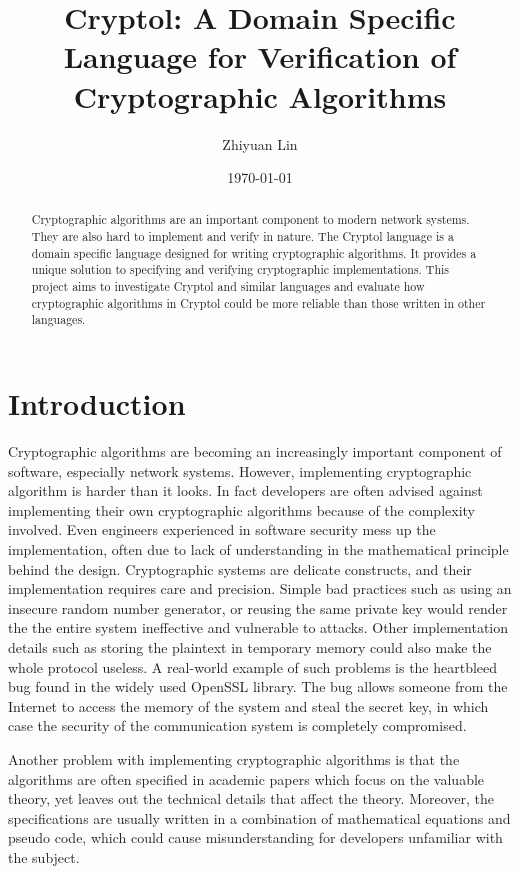 \documentclass[a4paper, notitlepage]{report}
\title{Cryptol: A Domain Specific Language for  Verification of Cryptographic Algorithms}
\author{Zhiyuan Lin}
\date{\today}
\begin{document}
\maketitle
\begin{abstract}
Cryptographic algorithms are an important component to modern network systems. They are also hard to implement 
and verify in nature. The Cryptol language is a domain specific language designed for writing cryptographic algorithms.
It provides a unique solution to specifying and verifying cryptographic implementations. This project aims to investigate Cryptol and similar languages and evaluate how cryptographic algorithms in Cryptol could be more reliable than those written 
in other languages. 
\end{abstract}

\newpage
\vspace{30pt}



\chapter{Introduction}


Cryptographic algorithms are becoming an increasingly important component
of software, especially network systems. However, implementing cryptographic algorithm is harder than it looks.
In fact developers are often advised against
implementing their own cryptographic algorithms
because of the complexity involved.
Even engineers experienced in software security mess up the implementation,
often due to lack of understanding in the mathematical principle
behind the design.
Cryptographic systems are delicate constructs,
and their implementation requires care and precision.
Simple bad practices such as using an insecure random number generator,
or reusing the same private key would render the the entire system ineffective
and vulnerable to attacks.
Other implementation details such as storing the plaintext in temporary memory
could also make the whole protocol useless.
A real-world example of such problems is the heartbleed bug
found in the widely used OpenSSL library.
The bug allows someone from the Internet to access the memory of the system
and steal the secret key, in which case the security of the communication
system is completely compromised.

Another problem with implementing cryptographic algorithms is that the algorithms are often specified in academic papers which focus on the valuable theory, yet leaves out the technical details that affect the theory. Moreover, the specifications are usually written in a combination of mathematical equations and pseudo code, which could cause misunderstanding for developers unfamiliar with the subject.
\end{document}
